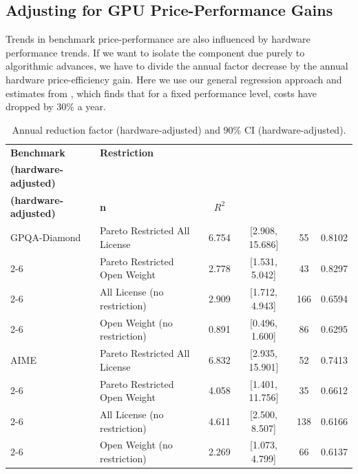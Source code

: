 \FloatBarrier
\subsection{Adjusting for GPU Price-Performance Gains}
Trends in benchmark price-performance are also influenced by hardware performance trends. If we want to isolate the component due purely to algorithmic advances, we have to divide the annual factor decrease by the annual hardware price-efficiency gain. Here we use our general regression approach and estimates from \citet{epoch2024priceperformancehardware}, which finds that for a fixed performance level, costs have dropped by $30\%$ a year.

\renewcommand{\arraystretch}{1.15}

\begin{table}[h!]
\centering
\caption{Annual reduction factor (hardware-adjusted) and 90\% CI (hardware-adjusted).}
\label{tab:regression_results_adjusted}

\small
\begin{tabular}{|l|l|c|c|c|c|}
\hline
\textbf{Benchmark} & \textbf{Restriction} &
\shortstack{\textbf{Annual reduction factor}\\\textbf{(hardware-adjusted)}} &
\shortstack{\textbf{90\% CI}\\\textbf{(hardware-adjusted)}} &
\textbf{n} & \textbf{$R^2$} \\
\hline

GPQA-Diamond & Pareto Restricted All License & 6.754 & [2.908, 15.686] & 55 & 0.8102 \\ \cline{2-6}
\rowcolor{restrgray} \cellcolor{white} & Pareto Restricted Open Weight & 2.778 & [1.531, 5.042] & 43 & 0.8297 \\ \cline{2-6}
\cellcolor{white} & All License (no restriction) & 2.909 & [1.712, 4.943] & 166 & 0.6594 \\ \cline{2-6}
\rowcolor{restrgray} \cellcolor{white} & Open Weight (no restriction) & 0.891 & [0.496, 1.600] & 86 & 0.6295 \\
\hline

AIME & Pareto Restricted All License & 6.832 & [2.935, 15.901] & 52 & 0.7413 \\ \cline{2-6}
\rowcolor{restrgray} \cellcolor{white} & Pareto Restricted Open Weight & 4.058 & [1.401, 11.756] & 35 & 0.6612 \\ \cline{2-6}
\cellcolor{white} & All License (no restriction) & 4.611 & [2.500, 8.507] & 138 & 0.6166 \\ \cline{2-6}
\rowcolor{restrgray} \cellcolor{white} & Open Weight (no restriction) & 2.269 & [1.073, 4.799] & 66 & 0.6137 \\
\hline


\end{tabular}
\end{table}

